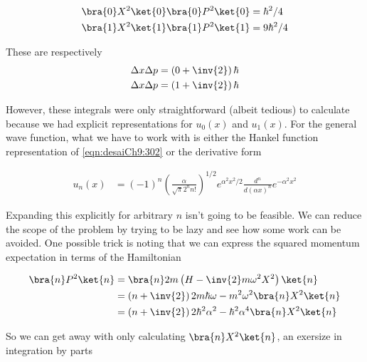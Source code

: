 \begin{align}\label{eqn:desaiCh9:303}
\bra{0} X^2 \ket{0} \bra{0} P^2 \ket{0} &= \hbar^2/4  \\
\bra{1} X^2 \ket{1} \bra{1} P^2 \ket{1} &= 9 \hbar^2/4
\end{align}

These are respectively
\begin{align}\label{eqn:desaiCh9:304}
\Delta x \Delta p &= \left( 0 + \inv{2} \right) \hbar \\
\Delta x \Delta p &= \left( 1 + \inv{2} \right) \hbar
\end{align}

However, these integrals were only straightforward (albeit tedious) to calculate because we had explicit representations for $u_0(x)$ and $u_1(x)$.  For the general wave function, what we have to work with is either the Hankel function representation of \ref{eqn:desaiCh9:302} or the derivative form

\begin{align}\label{eqn:desaiCh9:302b}
u_n(x) &= (-1)^n
\left( \frac{ \alpha}{\sqrt{\pi} 2^n n!} \right)^{1/2} 
e^{ \alpha^2 x^2/2}
\frac{d^n}{d (\alpha x)^n}
e^{ -\alpha^2 x^2}
\end{align}

Expanding this explicitly for arbitrary $n$ isn't going to be feasible.  We can reduce the scope of the problem by trying to be lazy and see how some work can be avoided.  One possible trick is noting that we can express the squared momentum expectation in terms of the Hamiltonian

\begin{align*}
\bra{n} P^2 \ket{n}
&=
\bra{n} 2m \left( H - \inv{2} m \omega^2 X^2 \right) \ket{n} \\
&=
\left( n + \inv{2} \right) 2 m \hbar \omega
- m^2 \omega^2 \bra{n} X^2 \ket{n} \\
&=
\left( n + \inv{2} \right) 2 \hbar^2 \alpha^2 
- \hbar^2 \alpha^4 \bra{n} X^2 \ket{n} \\
\end{align*}

So we can get away with only calculating $\bra{n} X^2 \ket{n}$, an exersize in integration by parts


